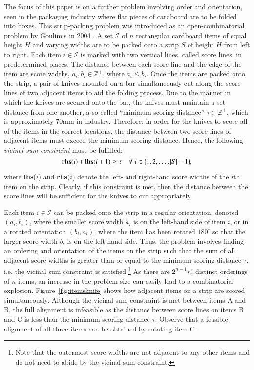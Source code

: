 \documentclass{elsarticle}
\begin{document}
The focus of this paper is on a further problem involving order and orientation, seen in the packaging industry where flat pieces of cardboard are to be folded into boxes. This strip-packing problem was introduced as an open-combinatorial problem by Goulimis in 2004 \cite{goulimis2004}. A set $\mathcal{I}$ of $n$ rectangular cardboard items of equal height $H$ and varying widths are to be packed onto a strip $S$ of height $H$ from left to right. Each item $i \in \mathcal{I}$ is marked with two vertical lines, called score lines, in predetermined places. The distance between each score line and the edge of the item are score widths, $a_i, b_i \in \mathbb{Z}^+$, where $a_i \leq b_i$. Once the items are packed onto the strip, a pair of knives mounted on a bar simultaneously cut along the score lines of two adjacent items to aid the folding process. Due to the manner in which the knives are secured onto the bar, the knives must maintain a set distance from one another, a so-called ``minimum scoring distance'' $\tau \in \mathbb{Z}^+$, which is approximately 70mm in industry. Therefore, in order for the knives to score all of the items in the correct locations, the distance between two score lines of adjacent items must exceed the minimum scoring distance. Hence, the following \emph{vicinal sum constraint} must be fulfilled:
\begin{equation}
	\label{eqn:vsc}
	\textbf{rhs}(i) + \textbf{lhs}(i+1) \geq \tau \quad \forall \hspace{1mm} i \in \{1,2,\dotsc,|S|- 1\},
\end{equation}

\noindent where \textbf{lhs}($i$) and \textbf{rhs}($i$) denote the left- and right-hand score widths of the $i$th item on the strip. Clearly, if this constraint is met, then the distance between the score lines will be sufficient for the knives to cut appropriately.

Each item $i \in \mathcal{I}$ can be packed onto the strip in a regular orientation, denoted $(a_i, b_i)$, where the smaller score width $a_i$ is on the left-hand side of item $i$, or in a rotated orientation $(b_i, a_i)$, where the item has been rotated $180^{\circ}$ so that the larger score width $b_i$ is on the left-hand side. Thus, the problem involves finding an ordering and orientation of the items on the strip such that the sum of all adjacent score widths is greater than or equal to the minimum scoring distance $\tau$, i.e. the vicinal sum constraint is satisfied.\footnote{Note that the outermost score widths are not adjacent to any other items and do not need to abide by the vicinal sum constraint.} As there are $2^{n-1} n!$ distinct orderings of $n$ items, an increase in the problem size can easily lead to a combinatorial explosion. Figure~\ref{fig:itemsknife} shows how adjacent items on a strip are scored simultaneously. Although the vicinal sum constraint is met between items A and B, the full alignment is infeasible as the distance between score lines on items B and C is less than the minimum scoring distance $\tau$. Observe that a feasible alignment of all three items can be obtained by rotating item C.
\end{document}
